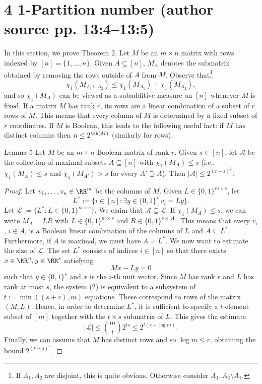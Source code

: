 \section*{4 1-Partition number (author source pp. 13:4--13:5)}
In this section, we prove Theorem 2.
Let $M$ be an $m\times n$ matrix with rows indexed by $[n]=\{1,\ldots,n\}$. Given $A\subseteq[n]$, $M_A$ denotes the submatrix obtained by removing the rows outside of $A$ from $M$. Observe that\footnote{If $A_1,A_2$ are disjoint, this is quite obvious. Otherwise consider $A_1,A_2\setminus A_1$.}
\[\chi_1(M_{A_1\cup A_2})\le\chi_1(M_{A_1})+\chi_1(M_{A_2}),\tag{1}\]
and so $\chi_1(M_A)$ can be viewed as a subadditive measure on $[n]$ whenever $M$ is fixed.
If a matrix $M$ has rank $r$, its rows are a linear combination of a subset of $r$ rows of $M$. This means that every column of $M$ is determined by a fixed subset of $r$ coordinates. If $M$ is Boolean, this leads to the following useful fact:
if $M$ has distinct columns then $n\le 2^{\rk(M)}$ (similarly for rows).
\begin{originalresult}{Lemma 5}
Let $M$ be an $m\times n$ Boolean matrix of rank $r$. Given $s\in[n]$, let $\mathcal A$ be the collection of maximal subsets $A\subseteq[n]$ with $\chi_1(M_A)\le s$ (i.e., $\chi_1(M_A)\le s$ and $\chi_1(M_{A'})>s$ for every $A'\supsetneq A$). Then $|\mathcal A|\le 2^{(r+s)^2}$.
\end{originalresult}
\begin{proof}
Let $v_1,\ldots,v_n\in\RR^m$ be the columns of $M$. Given $L\in\{0,1\}^{m\times s}$, let
\[L^*:=\{i\in[n]:\exists y\in\{0,1\}^s\ v_i=Ly\}.\]
Let $\mathcal L:=\{L^*:L\in\{0,1\}^{m\times s}\}$.
We claim that $\mathcal A\subseteq\mathcal L$. If $\chi_1(M_A)\le s$, we can write $M_A=LR$ with $L\in\{0,1\}^{m\times s}$ and $R\in\{0,1\}^{s\times|A|}$. This means that every $v_i$, $i\in A$, is a Boolean linear combination of the columns of $L$ and $A\subseteq L^*$. Furthermore, if $A$ is maximal, we must have $A=L^*$.
We now want to estimate the size of $\mathcal L$. The set $L^*$ consists of indices $i\in[n]$ so that there exists $x\in\RR^n,y\in\RR^s$ satisfying
\[Mx-Ly=0\tag{2}\]
such that $y\in\{0,1\}^s$ and $x$ is the $i$-th unit vector. Since $M$ has rank $r$ and $L$ has rank at most $s$, the system (2) is equivalent to a subsystem of $t:=\min((s+r),m)$ equations. These correspond to rows of the matrix $(M,L)$. Hence, in order to determine $L^*$, it is sufficient to specify a $t$-element subset of $[m]$ together with the $t\times s$ submatrix of $L$. This gives the estimate
\[|\mathcal L|\le\binom mt2^{ts}\le2^{t(s+\log m)}.\]
Finally, we can assume that $M$ has distinct rows and so $\log m\le r$, obtaining the bound $2^{(r+s)^2}$.
\end{proof}
